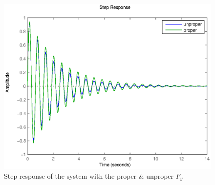\begin{figure}[h!b]
    \includegraphics[width=\columnwidth]{fig/stepProper421.eps}
    \caption{Step response of the system with the proper \& unproper $F_y$} 
    \label{stepProper421}
\end{figure}

